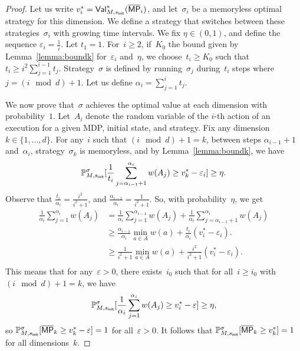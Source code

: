 \documentclass{llncs}
\newcommand{\initState}{\ensuremath{s_{{\sf init}}} }
\newcommand*{\pr}{\mathbb{P}}
\newcommand*{\mpsup}{\ensuremath{\overline{\mathsf{MP}}}}
\newcommand\Val{\textrm{\sf Val}}
\begin{document}
\begin{proof}
  Let us write $v_i^*=\Val_{M,\initState}^*(\mpsup_i)$, and let~$\sigma_i$ be a memoryless 
  optimal strategy for this dimension.
  We define a strategy that switches between these strategies~$\sigma_i$ with growing time intervals. 
  We fix $\eta \in (0,1)$, and define the sequence $\varepsilon_i = \frac{1}{i}$.
  Let $t_1 = 1$. For~$i\geq 2$, if~$K_0$ the bound given by Lemma~\ref{lemma:boundk}
  for~$\varepsilon_i$ and~$\eta$, we choose~$t_i\geq K_0$ such that ${t_i}\geq i^2 \sum_{j=1}^{i-1}t_{j}$.
  Strategy~$\sigma$ is defined by running~$\sigma_j$ during~$t_i$ steps where $j = (i \mod d) + 1$.
  Let us define $\alpha_i = \sum_{j=1}^i t_j$.
  
  We now prove that~$\sigma$ achieves the optimal value at each dimension with probability~$1$.
  Let~$A_i$ denote the random variable of the $i$-th action of an execution for a given MDP, initial state, and strategy.
  Fix any dimension $k \in \{1,\ldots,d\}$. For any~$i$ such that $(i \mod d) + 1 = k$,
  between steps $\alpha_{i-1}+1$ and~$\alpha_{i}$, strategy~$\sigma_k$ is memoryless, and by Lemma~\ref{lemma:boundk},
  we have
  \[
  \pr_{M,\initState}^\sigma[\frac{1}{t_i} \sum_{j=\alpha_{i-1}+1}^{\alpha_i} w(A_j) \geq v_k^* - \varepsilon_i] \geq \eta.
  \]
  Observe that $\frac{t_i}{\alpha_i} = \frac{i^2}{i^2+1}$, and $\frac{\alpha_{i-1}}{\alpha_i} = \frac{1}{i^2+1}$.
  So, with probability~$\eta$, we get
  \[
  \begin{array}{ll}
    \frac{1}{\alpha_i} \sum_{j=1}^{\alpha_i} w(A_j) &=\frac{1}{\alpha_i}\sum_{j=1}^{\alpha_{i-1}} w(A_j) + \frac{1}{\alpha_i}\sum_{j=\alpha_{i-1}+1}^{\alpha_i} w(A_j)\\
    &\geq \frac{\alpha_{i-1}}{\alpha_i} \min_{a \in A} w(a) + \frac{t_i}{\alpha_i} (v_i^* - \varepsilon_i).\\
    &\geq \frac{1}{i^2+1} \min_{a \in A} w(a) + \frac{i^2}{i^2+1} (v_i^* - \varepsilon_i).\\
  \end{array}
  \]
  This means that for any~$\varepsilon>0$, there exists~$i_0$ such that for all~$i\geq i_0$ with $(i \mod d) + 1  =k$, we have
  \[
  \pr_{M,\initState}^\sigma[\frac{1}{\alpha_i} \sum_{j=1}^{\alpha_i} w(A_j) \geq v_i^* - \varepsilon] \geq \eta,
  \]
  so $\pr_{M,\initState}^\sigma[\mpsup_k \geq v_k^*-\varepsilon] = 1$ for all~$\varepsilon>0$.
  It follows that $\pr_{M,\initState}^\sigma[\mpsup_k \geq v_k^*] = 1$ for all dimensions~$k$.
\end{proof}
\end{document}
